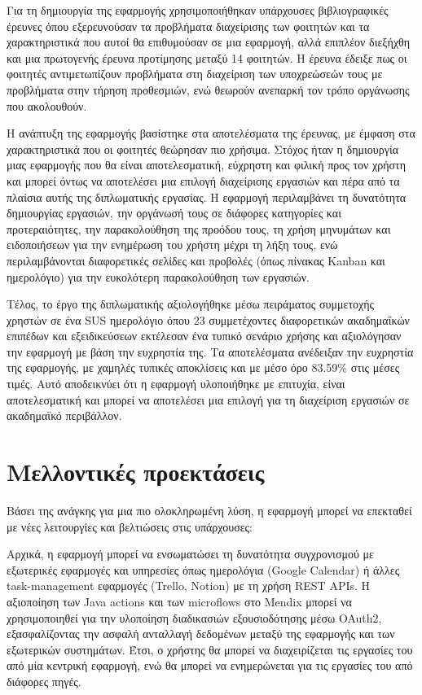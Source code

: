         Για τη δημιουργία της εφαρμογής χρησιμοποιήθηκαν υπάρχουσες βιβλιογραφικές έρευνες όπου εξερευνούσαν τα προβλήματα διαχείρισης των φοιτητών και τα χαρακτηριστικά που αυτοί θα επιθυμούσαν σε μια εφαρμογή, αλλά επιπλέον διεξήχθη και μια πρωτογενής έρευνα προτίμησης μεταξύ 14 φοιτητών. Η έρευνα έδειξε πως οι φοιτητές αντιμετωπίζουν προβλήματα στη διαχείριση των υποχρεώσεών τους με προβλήματα στην τήρηση προθεσμιών, ενώ θεωρούν ανεπαρκή τον τρόπο οργάνωσης που ακολουθούν.

        Η ανάπτυξη της εφαρμογής βασίστηκε στα αποτελέσματα της έρευνας, με έμφαση στα χαρακτηριστικά που οι φοιτητές θεώρησαν πιο χρήσιμα. Στόχος ήταν η δημιουργία μιας εφαρμογής που θα είναι αποτελεσματική, εύχρηστη και φιλική προς τον χρήστη και μπορεί όντως να αποτελέσει μια επιλογή διαχείρισης εργασιών και πέρα από τα πλαίσια αυτής της διπλωματικής εργασίας. Η εφαρμογή περιλαμβάνει τη δυνατότητα δημιουργίας εργασιών, την οργάνωσή τους σε διάφορες κατηγορίες και προτεραιότητες, την παρακολούθηση της προόδου τους, τη χρήση μηνυμάτων και ειδοποιήσεων για την ενημέρωση του χρήστη μέχρι τη λήξη τους, ενώ περιλαμβάνονται διαφορετικές σελίδες και προβολές (όπως πίνακας Kanban και ημερολόγιο) για την ευκολότερη παρακολούθηση των εργασιών.

        Τέλος, το έργο της διπλωματικής αξιολογήθηκε μέσω πειράματος συμμετοχής χρηστών σε ένα SUS ημερολόγιο όπου 23 συμμετέχοντες διαφορετικών ακαδημαϊκών επιπέδων και εξειδικεύσεων εκτέλεσαν ένα τυπικό σενάριο χρήσης και αξιολόγησαν την εφαρμογή με βάση την ευχρηστία της. Τα αποτελέσματα ανέδειξαν την ευχρηστία της εφαρμογής, με χαμηλές τυπικές αποκλίσεις και με μέσο όρο 83.59\% στις μέσες τιμές. Αυτό αποδεικνύει ότι η εφαρμογή υλοποιήθηκε με επιτυχία, είναι αποτελεσματική και μπορεί να αποτελέσει μια επιλογή για τη διαχείριση εργασιών σε ακαδημαϊκό περιβάλλον.


    \section{Μελλοντικές προεκτάσεις}
        Βάσει της ανάγκης για μια πιο ολοκληρωμένη λύση, η εφαρμογή μπορεί να επεκταθεί με νέες λειτουργίες και βελτιώσεις στις υπάρχουσες:

        Αρχικά, η εφαρμογή μπορεί να ενσωματώσει τη δυνατότητα συγχρονισμού με εξωτερικές εφαρμογές και υπηρεσίες όπως ημερολόγια (Google Calendar) ή άλλες task-management εφαρμογές (Trello, Notion) με τη χρήση REST APIs. Η αξιοποίηση των Java actions και των microflows στο Mendix μπορεί να χρησιμοποιηθεί για την υλοποίηση διαδικασιών εξουσιοδότησης μέσω OAuth2, εξασφαλίζοντας την ασφαλή ανταλλαγή δεδομένων μεταξύ της εφαρμογής και των εξωτερικών συστημάτων. Έτσι, ο χρήστης θα μπορεί να διαχειρίζεται τις εργασίες του από μία κεντρική εφαρμογή, ενώ θα μπορεί να ενημερώνεται για τις εργασίες του από διάφορες πηγές.

